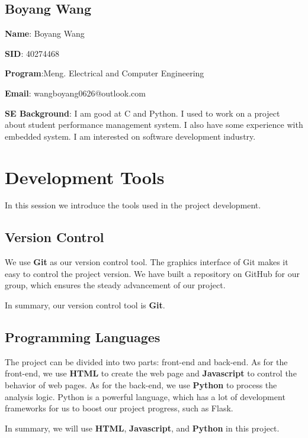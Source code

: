\documentclass[conference]{IEEEtran}
\begin{document}
\subsection{Boyang Wang}

\textbf{Name}: Boyang Wang

\textbf{SID}: 40274468

\textbf{Program}:Meng. Electrical and Computer Engineering

\textbf{Email}: wangboyang0626@outlook.com

\textbf{SE Background}: I am good at C and Python. I used to work on a project about student performance management system. I also have some experience with embedded system. I am interested on software development industry.



\section{Development Tools}

In this session we introduce the tools used in the project development.


\subsection{Version Control}

We use \textbf{Git} as our version control tool. The graphics interface of Git makes it easy to control the project version. We have built a repository on GitHub for our group, which ensures the steady advancement of our project.

In summary, our version control tool is \textbf{Git}.
 
\subsection{Programming Languages}

The project can be divided into two parts: front-end and back-end. As for the front-end, we use \textbf{HTML} to create the web page and \textbf{Javascript} to control the behavior of web pages. As for the back-end, we use \textbf{Python} to process the analysis logic. Python is a powerful language, which has a lot of development frameworks for us to boost our project progress, such as Flask. 

In summary, we will use \textbf{HTML}, \textbf{Javascript}, and \textbf{Python} in this project.
\end{document}
